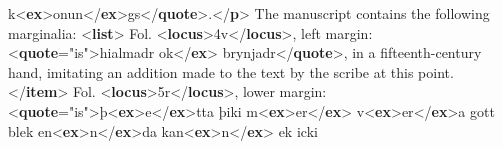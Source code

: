 \begin{shaded}
\hspace*{1em}\hspace*{1em}\hspace*{1em}\hspace*{1em} k{<\textbf{ex}>}onun{</\textbf{ex}>}gs{</\textbf{quote}>}.{</\textbf{p}>}\mbox{}\newline 
{}The manuscript contains the following marginalia: {<\textbf{list}>}\mbox{}\newline 
\hspace*{1em}\hspace*{1em}Fol. {<\textbf{locus}>}4v{</\textbf{locus}>}, left margin: {<\textbf{quote}\hspace*{1em}{xml:lang}="{is}">}hialmadr\mbox{}\newline 
\hspace*{1em}\hspace*{1em}\hspace*{1em}ok{</\textbf{ex}>}\mbox{}\newline 
\hspace*{1em}\hspace*{1em}\hspace*{1em}\hspace*{1em}brynjadr{</\textbf{quote}>}, in a fifteenth-century hand, imitating an addition made\mbox{}\newline 
\hspace*{1em}\hspace*{1em}\hspace*{1em}\hspace*{1em}\hspace*{1em}\hspace*{1em} to the text by the scribe at this point.{</\textbf{item}>}\mbox{}\newline 
\hspace*{1em}\hspace*{1em}Fol. {<\textbf{locus}>}5r{</\textbf{locus}>}, lower margin: {<\textbf{quote}\hspace*{1em}{xml:lang}="{is}">}þ{<\textbf{ex}>}e{</\textbf{ex}>}tta\mbox{}\newline 
\hspace*{1em}\hspace*{1em}\hspace*{1em}\hspace*{1em}\hspace*{1em}\hspace*{1em}\hspace*{1em}\hspace*{1em} þiki m{<\textbf{ex}>}er{</\textbf{ex}>} v{<\textbf{ex}>}er{</\textbf{ex}>}a gott blek en{<\textbf{ex}>}n{</\textbf{ex}>}da kan{<\textbf{ex}>}n{</\textbf{ex}>} ek icki\mbox{}\newline 

\end{shaded}
